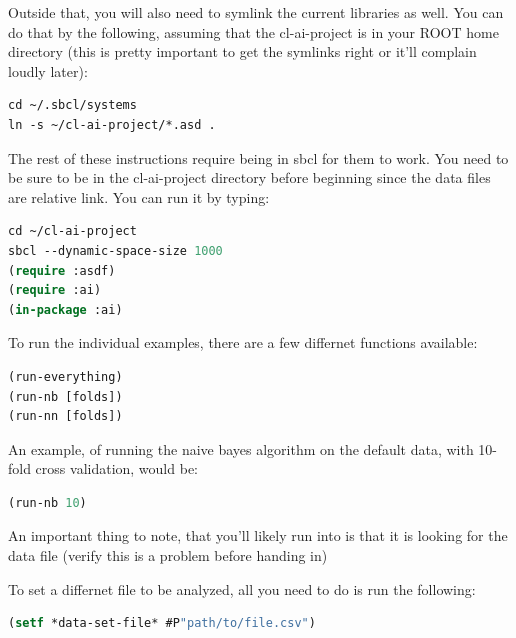 \documentclass{article}
\begin{document}
Outside that, you will also need to symlink the current libraries as well.  You can do that by the following, assuming that the cl-ai-project is in your ROOT home directory (this is pretty important to get the symlinks right or it'll complain loudly later):
\begin{lstlisting}[frame=single]
cd ~/.sbcl/systems
ln -s ~/cl-ai-project/*.asd .
\end{lstlisting}
The rest of these instructions require being in sbcl for them to work.  You need to be sure to be in the cl-ai-project directory before beginning since the data files are relative link.  You can run it by typing:
\begin{lstlisting}[frame=single,language=lisp]
cd ~/cl-ai-project
sbcl --dynamic-space-size 1000
(require :asdf)
(require :ai)
(in-package :ai)
\end{lstlisting}

To run the individual examples, there are a few differnet functions available:
\begin{lstlisting}[frame=single,language=lisp]
(run-everything)
(run-nb [folds])
(run-nn [folds])
\end{lstlisting}

An example, of running the naive bayes algorithm on the default data, with 10-fold cross validation, would be:
\begin{lstlisting}[frame=single,language=lisp]
(run-nb 10)
\end{lstlisting}

An important thing to note, that you'll likely run into is that it is looking for the data file (verify this is a problem before handing in)

To set a differnet file to be analyzed, all you need to do is run the following:
\begin{lstlisting}[frame=single,language=lisp]
(setf *data-set-file* #P"path/to/file.csv")
\end{lstlisting}
\end{document}
